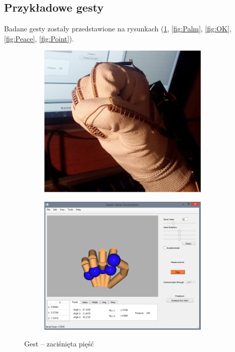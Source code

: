 \documentclass[12pt,a4paper]{article}
\begin{document}
\subsection{Przykładowe gesty}
Badane gesty zostały przedstawione na rysunkach (\ref{fig:Fist}, \ref{fig:Palm}, \ref{fig:OK}, \ref{fig:Peace}, \ref{fig:Point}).
\begin{figure}[!htb]
\centering
    \begin{subfigure}{.5\textwidth}
    \centering
      \includegraphics[width=0.9\textwidth]{./images/Fist.jpg}
     \end{subfigure}%
    \begin{subfigure}{.5\textwidth}
    \centering
      \includegraphics[width=0.9\textwidth]{./images/FistQt.png}
     \end{subfigure}
    \caption{Gest -- zaciśnięta pięść \label{fig:Fist}}
\end{figure}
\end{document}
